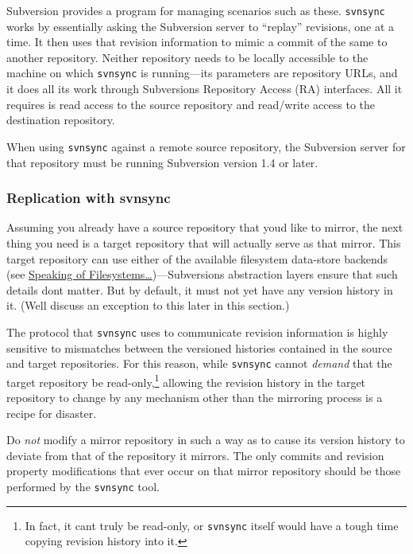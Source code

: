 Subversion provides a program for managing scenarios such as these.
\texttt{svnsync} works by essentially asking the Subversion server to
``replay'' revisions, one at a time. It then uses that revision
information to mimic a commit of the same to another repository. Neither
repository needs to be locally accessible to the machine on which
\texttt{svnsync} is running---its parameters are repository URLs, and it
does all its work through Subversion\textquotesingle s Repository Access
(RA) interfaces. All it requires is read access to the source repository
and read/write access to the destination repository.

When using \texttt{svnsync} against a remote source repository, the
Subversion server for that repository must be running Subversion version
1.4 or later.

\subsubsection{Replication with
svnsync}\label{svn.reposadmin.maint.replication.svnsync}

Assuming you already have a source repository that you\textquotesingle d
like to mirror, the next thing you need is a target repository that will
actually serve as that mirror. This target repository can use either of
the available filesystem data-store backends (see
\hyperref[svn.reposadmin.basics.backends]{Speaking of
Filesystems\ldots{}})---Subversion\textquotesingle s abstraction layers
ensure that such details don\textquotesingle t matter. But by default,
it must not yet have any version history in it. (We\textquotesingle ll
discuss an exception to this later in this section.)

The protocol that \texttt{svnsync} uses to communicate revision
information is highly sensitive to mismatches between the versioned
histories contained in the source and target repositories. For this
reason, while \texttt{svnsync} cannot \emph{demand} that the target
repository be read-only,\footnote{In fact, it can\textquotesingle t
  truly be read-only, or \texttt{svnsync} itself would have a tough time
  copying revision history into it.} allowing the revision history in
the target repository to change by any mechanism other than the
mirroring process is a recipe for disaster.

Do \emph{not} modify a mirror repository in such a way as to cause its
version history to deviate from that of the repository it mirrors. The
only commits and revision property modifications that ever occur on that
mirror repository should be those performed by the \texttt{svnsync}
tool.

